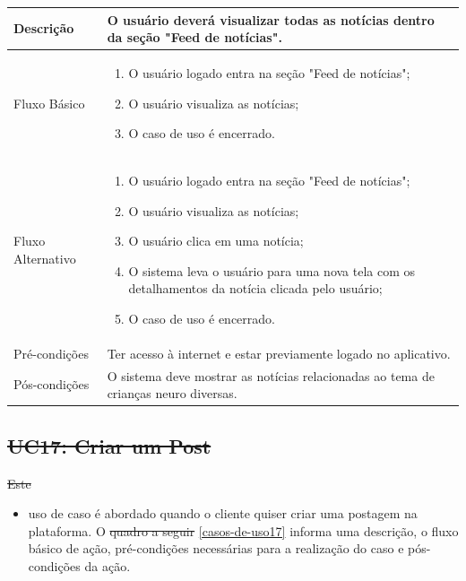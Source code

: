\documentclass[
    12pt,               %
    openright,          %
    oneside,
    a4paper,            %
    paginasA3,  %
    BIBLATEX,           %
    REFINDENT,          %
    MODELO,             %
    TODO,               %
    english,            %
    brazil              %
    ]{ifsp-spo-inf-ctds} %
\providecommand{\DIFadd}[1]{{\protect\color{blue}\uwave{#1}}} %
\providecommand{\DIFdel}[1]{{\protect\color{red}\sout{#1}}}                      %
\providecommand{\DIFaddbegin}{} %
\providecommand{\DIFaddend}{} %
\providecommand{\DIFdelbegin}{} %
\providecommand{\DIFdelend}{} %
\begin{document}
\begin{apendicesenv}
\begin{longtable}{|p{3.3cm}|p{12.3cm}|}
		\DIFaddend Descrição & O usuário deverá visualizar todas as notícias dentro da seção "Feed de notícias".\\
		\hline
		Fluxo Básico  & 
		\begin{enumerate}
			\item O usuário logado entra na seção "Feed de notícias";
			\item O usuário visualiza as notícias;
			\item O caso de uso é encerrado. 
		\end{enumerate}\\
		\hline
		Fluxo Alternativo &
		\begin{enumerate}
			\item O usuário logado entra na seção "Feed de notícias";
			\item O usuário visualiza as notícias;
			\item O usuário clica em uma notícia;
			\item O sistema leva o usuário para uma nova tela com os detalhamentos da notícia clicada pelo usuário;
			\item O caso de uso é encerrado. 
		\end{enumerate}\\
		\hline
		Pré-condições & Ter acesso à internet e estar previamente logado no aplicativo.\\
		\hline
		Pós-condições & O sistema deve mostrar as notícias relacionadas ao tema de crianças neuro diversas.\\
		\hline
	\end{longtable}
	\DIFaddbegin {}
	\DIFaddend 

	\DIFdelbegin \subsection{\DIFdel{UC17: Criar um Post}}
\addtocounter{subsection}{-1}%
\DIFdelend %

	\DIFdelbegin \DIFdel{Este }\DIFdelend \DIFaddbegin \begin{itemize}
		\item \DIFadd{UC17: Criar um Post -Este }\DIFaddend uso de caso é abordado quando o cliente quiser criar uma postagem na plataforma. O 	\DIFdelbegin \DIFdel{quadro a seguir }\DIFdelend \DIFaddbegin \autoref{casos-de-uso17} \DIFaddend informa uma descrição, o fluxo básico de ação, pré-condições necessárias para a realização do caso e pós-condições da ação.\\
	\DIFaddbegin \end{itemize}
	\DIFaddend 


\end{apendicesenv}
\end{document}
